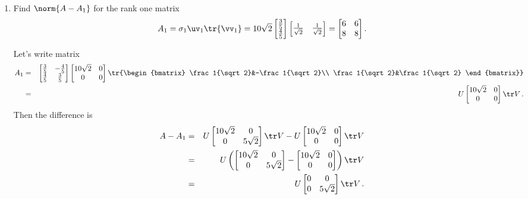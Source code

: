 \begin{example}
\begin{enumerate}
\begin{enumerate}
\item Find \(\norm{A-A_1}\) for the rank one matrix 
\begin{equation*}
A_1=\sigma_1\uv_1\tr{\vv_1}
=10\sqrt2\begin{bmatrix} \frac35\\\frac45 \end{bmatrix}
\begin{bmatrix} \frac1{\sqrt2}&\frac1{\sqrt2} \end{bmatrix}
=\begin{bmatrix} 6&6\\8&8 \end{bmatrix}.
\end{equation*}
\begin{solution} 
Let's write matrix
\begin{eqnarray*}
A_1&=&\begin{bmatrix} \frac35&-\frac45\\\frac45&\frac35 \end{bmatrix}
\begin{bmatrix} 10\sqrt2&0\\0&0 \end{bmatrix}
\tr{\begin{bmatrix} \frac1{\sqrt2}&-\frac1{\sqrt2}\\ \frac1{\sqrt2}&\frac1{\sqrt2} \end{bmatrix}}
\\&=&U\begin{bmatrix} 10\sqrt2&0\\0&0 \end{bmatrix}\tr V\,.
\end{eqnarray*}
Then the difference is
\begin{eqnarray*}
A-A_1&=&U\begin{bmatrix} 10\sqrt2&0\\0&5\sqrt2 \end{bmatrix}\tr V
-U\begin{bmatrix} 10\sqrt2&0\\0&0 \end{bmatrix}\tr V
\\&=&U\left(\begin{bmatrix} 10\sqrt2&0\\0&5\sqrt2 \end{bmatrix}
-\begin{bmatrix} 10\sqrt2&0\\0&0 \end{bmatrix}\right)\tr V
\\&=&U\begin{bmatrix} 0&0\\0&5\sqrt2 \end{bmatrix}\tr V\,.

\end{eqnarray*}
\end{solution}
\end{enumerate}
\end{enumerate}
\end{example}
